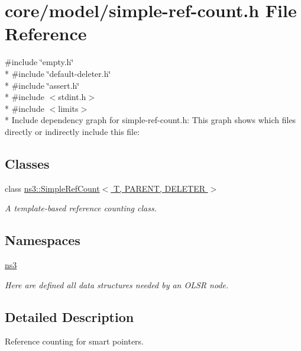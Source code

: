 \hypertarget{simple-ref-count_8h}{}\section{core/model/simple-\/ref-\/count.h File Reference}
\label{simple-ref-count_8h}
{\ttfamily \#include \char`\"{}empty.\+h\char`\"{}}\\*
{\ttfamily \#include \char`\"{}default-\/deleter.\+h\char`\"{}}\\*
{\ttfamily \#include \char`\"{}assert.\+h\char`\"{}}\\*
{\ttfamily \#include $<$stdint.\+h$>$}\\*
{\ttfamily \#include $<$limits$>$}\\*
Include dependency graph for simple-\/ref-\/count.h\+:
This graph shows which files directly or indirectly include this file\+:
\subsection*{Classes}
\begin{DoxyCompactItemize}
\item 
class \hyperlink{classns3_1_1SimpleRefCount}{ns3\+::\+Simple\+Ref\+Count$<$ T, P\+A\+R\+E\+N\+T, D\+E\+L\+E\+T\+E\+R $>$}
\begin{DoxyCompactList}\small\item\em A template-\/based reference counting class. \end{DoxyCompactList}\end{DoxyCompactItemize}
\subsection*{Namespaces}
\begin{DoxyCompactItemize}
\item 
 \hyperlink{namespacens3}{ns3}
\begin{DoxyCompactList}\small\item\em Here are defined all data structures needed by an O\+L\+SR node. \end{DoxyCompactList}\end{DoxyCompactItemize}


\subsection{Detailed Description}
Reference counting for smart pointers. 